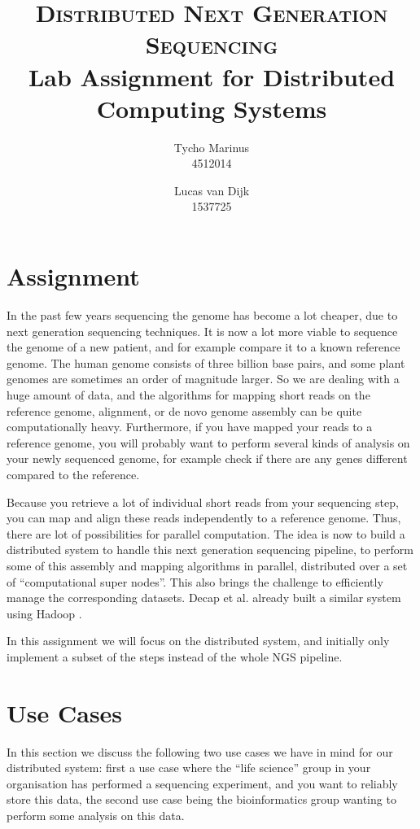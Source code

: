 \documentclass[a4paper,article,oneside]{memoir}
\title{\huge{\textsc{Distributed Next Generation Sequencing}}\\\Large{Lab Assignment for Distributed Computing Systems}}
\author{Tycho Marinus\\4512014 \and Lucas van Dijk\\1537725}
\begin{document}
\maketitle

\chapter{Assignment}

In the past few years sequencing the genome has become a lot cheaper, due to next generation sequencing techniques. It is now a lot more viable to sequence the genome of a new patient, and for example compare it to a known reference genome. The human genome consists of three billion base pairs, and some plant genomes are sometimes an order of magnitude larger. So we are dealing with a huge amount of data, and the algorithms for mapping short reads on the reference genome, alignment, or de novo genome assembly can be quite computationally heavy. Furthermore, if you have mapped your reads to a reference genome, you will probably want to perform several kinds of analysis on your newly sequenced genome, for example check if there are any genes different compared to the reference. 

Because you retrieve a lot of individual short reads from your sequencing step, you can map and align these reads independently to a reference genome. Thus, there are lot of possibilities for parallel computation. The idea is now to build a distributed system to handle this next generation sequencing pipeline, to perform some of this assembly and mapping algorithms in parallel, distributed over a set of ``computational super nodes''. This also brings the challenge to efficiently manage the corresponding datasets. Decap et al. already built a similar system using Hadoop \cite{decap2015halvade}.

In this assignment we will focus on the distributed system, and initially only implement a subset of the steps instead of the whole NGS pipeline.

\chapter{Use Cases}

In this section we discuss the following two use cases we have in mind for our distributed system: first a use case where the ``life science'' group in your organisation has performed a sequencing experiment, and you want to reliably store this data, the second use case being the bioinformatics group wanting to perform some analysis on this data.
\end{document}
